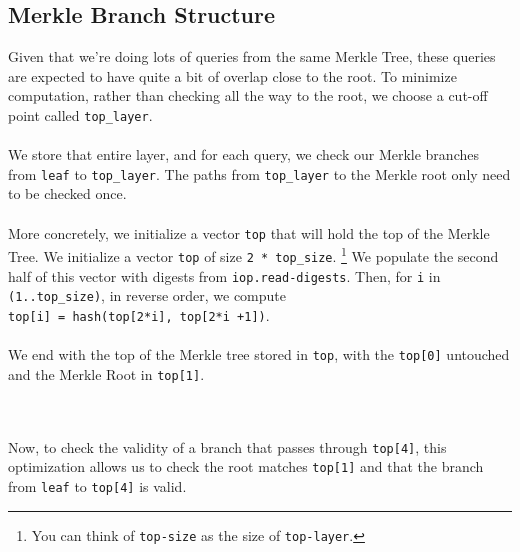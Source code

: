 \documentclass[10pt,letterpaper,titlepage]{article}
\theoremstyle{definition}
\begin{document}
\begin{appendices}
\subsection*{Merkle Branch Structure}
\label{merkle branch}
Given that we're doing lots of queries from the same Merkle Tree, these queries are expected to have quite a bit of overlap close to the root.
To minimize computation, rather than checking all the way to the root, we choose a cut-off point called \texttt{top\_layer}.\\
\\
We store that entire layer, and for each query, we check our Merkle branches from \texttt{leaf} to \texttt{top\_layer}.
The paths from \texttt{top\_layer} to the Merkle root only need to be checked once.\\
\\
More concretely, we initialize a vector \texttt{top} that will hold the top of the Merkle Tree. We initialize a vector \texttt{top} of size \texttt{2 * top\_size}.%
\footnote{You can think of \texttt{top-size} as the size of \texttt{top-layer}.} We populate the second half of this vector with digests from \texttt{iop.read-digests}.
Then, for \texttt{i} in \texttt{(1..top\_size)}, in reverse order, we compute \\
\texttt{top[i] = hash(top[2*i], top[2*i +1])}. \\
\\
We end with the top of the Merkle tree stored in \texttt{top}, with the \texttt{top[0]} untouched and the Merkle Root in \texttt{top[1]}.\\
\begin{figure}[h]
  \centering
{}
\end{figure}\\
\\
Now, to check the validity of a branch that passes through \texttt{top[4]}, this optimization allows us to check the root matches \texttt{top[1]} and that the branch from \texttt{leaf} to \texttt{top[4]} is valid.





\end{appendices}
\end{document}

